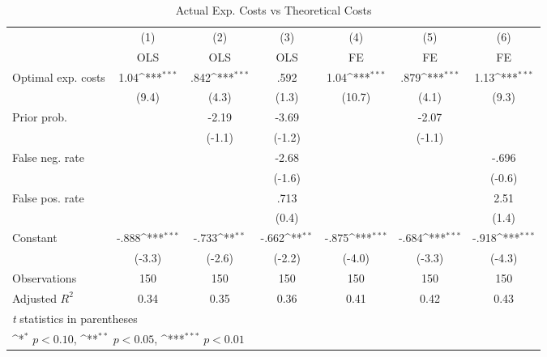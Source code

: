 \begin{table}[htbp]\centering
\def\sym#1{\ifmmode^{#1}\else\(^{#1}\)\fi}
\caption{Actual Exp. Costs vs Theoretical Costs}
\begin{tabular}{l*{6}{c}}
\hline\hline
                &\multicolumn{1}{c}{(1)}&\multicolumn{1}{c}{(2)}&\multicolumn{1}{c}{(3)}&\multicolumn{1}{c}{(4)}&\multicolumn{1}{c}{(5)}&\multicolumn{1}{c}{(6)}\\
                &\multicolumn{1}{c}{OLS}&\multicolumn{1}{c}{OLS}&\multicolumn{1}{c}{OLS}&\multicolumn{1}{c}{FE}&\multicolumn{1}{c}{FE}&\multicolumn{1}{c}{FE}\\
\hline
Optimal exp. costs&     1.04\sym{***}&     .842\sym{***}&     .592         &     1.04\sym{***}&     .879\sym{***}&     1.13\sym{***}\\
                &    (9.4)         &    (4.3)         &    (1.3)         &   (10.7)         &    (4.1)         &    (9.3)         \\
Prior prob.     &                  &    -2.19         &    -3.69         &                  &    -2.07         &                  \\
                &                  &   (-1.1)         &   (-1.2)         &                  &   (-1.1)         &                  \\
False neg. rate &                  &                  &    -2.68         &                  &                  &    -.696         \\
                &                  &                  &   (-1.6)         &                  &                  &   (-0.6)         \\
False pos. rate &                  &                  &     .713         &                  &                  &     2.51         \\
                &                  &                  &    (0.4)         &                  &                  &    (1.4)         \\
Constant        &    -.888\sym{***}&    -.733\sym{**} &    -.662\sym{**} &    -.875\sym{***}&    -.684\sym{***}&    -.918\sym{***}\\
                &   (-3.3)         &   (-2.6)         &   (-2.2)         &   (-4.0)         &   (-3.3)         &   (-4.3)         \\
\hline
Observations    &      150         &      150         &      150         &      150         &      150         &      150         \\
Adjusted \(R^{2}\)&     0.34         &     0.35         &     0.36         &     0.41         &     0.42         &     0.43         \\
\hline\hline
\multicolumn{7}{l}{\footnotesize \textit{t} statistics in parentheses}\\
\multicolumn{7}{l}{\footnotesize \sym{*} \(p<0.10\), \sym{**} \(p<0.05\), \sym{***} \(p<0.01\)}\\
\end{tabular}
\end{table}
